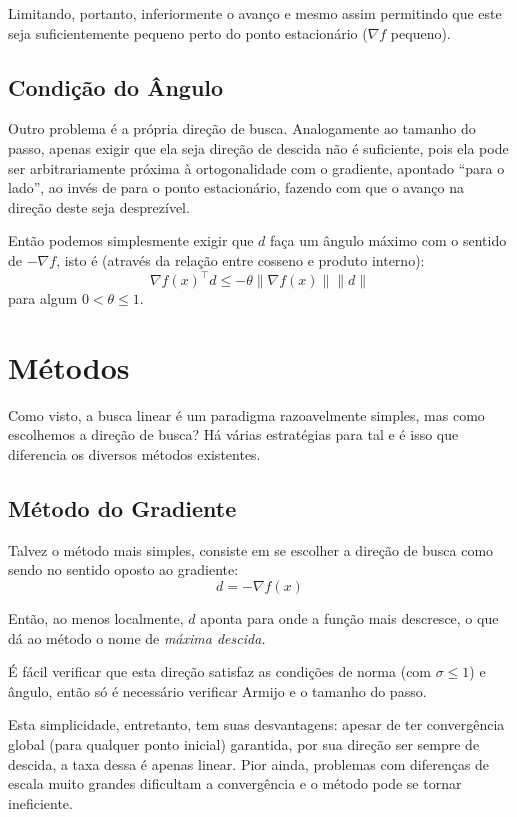 \documentclass[a4paper,11pt]{article}
\begin{document}
            Limitando, portanto, inferiormente o avanço e mesmo assim permitindo que este seja suficientemente pequeno perto do ponto estacionário
            ($ \nabla f $ pequeno).

        \subsection*{Condição do Ângulo}
            Outro problema é a própria direção de busca. Analogamente ao tamanho do passo, apenas exigir que ela seja direção de descida não
            é suficiente, pois ela pode ser arbitrariamente próxima à ortogonalidade com o gradiente, apontado ``para o lado'', ao invés de
            para o ponto estacionário, fazendo com que o avanço na direção deste seja desprezível.

            Então podemos simplesmente exigir que $d$ faça um ângulo máximo com o sentido de $-\nabla f$, isto é (através da relação entre cosseno
            e produto interno):
                $$ \nabla f(x)^\top d \leq -\theta \|\nabla f(x)\| \|d\| $$
            para algum $0 < \theta \leq 1$.

    \newpage
    \section*{Métodos}
        Como visto, a busca linear é um paradigma razoavelmente simples, mas como escolhemos a direção de busca? Há várias estratégias para tal e é
        isso que diferencia os diversos métodos existentes.

        \subsection*{Método do Gradiente}
            Talvez o método mais simples, consiste em se escolher a direção de busca como sendo no sentido oposto ao gradiente:
                $$ d = -\nabla f(x) $$

            Então, ao menos localmente, $d$ aponta para onde a função mais descresce, o que dá ao método o nome de \emph{máxima descida.}

            É fácil verificar que esta direção satisfaz as condições de norma (com $\sigma \leq 1$) e ângulo, então só é necessário verificar Armijo e o tamanho do passo.

            Esta simplicidade, entretanto, tem suas desvantagens: apesar de ter convergência global (para qualquer ponto inicial) garantida,
            por sua direção ser sempre de descida, a taxa dessa é apenas linear. Pior ainda, problemas com diferenças de escala muito grandes dificultam a convergência
            e o método pode se tornar ineficiente.
\end{document}
